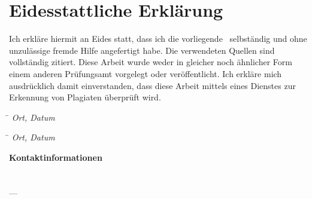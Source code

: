 
\chapter*{Eidesstattliche Erklärung}

Ich erkläre hiermit an Eides statt, dass ich die vorliegende \DocumentThesisType\ selbständig und ohne unzulässige fremde Hilfe angefertigt habe. Die verwendeten Quellen sind vollständig zitiert. Diese Arbeit wurde weder in gleicher noch ähnlicher Form einem anderen Prüfungsamt vorgelegt oder veröffentlicht. Ich erkläre mich ausdrücklich damit einverstanden, dass diese Arbeit mittels eines Dienstes zur Erkennung von Plagiaten überprüft wird.

\vspace{2cm}

\begin{tabbing}
  \hspace{6cm} \= \kill
  \textit{Ort, Datum} \> \textit{\DocumentAuthorPrename\ \DocumentAuthorName}
\end{tabbing}
\vspace{1cm}
\begin{tabbing}
	\hspace{6cm} \= \kill
	\textit{Ort, Datum} \> \textit{\DocumentSecondAuthorPrename\ \DocumentSecondAuthorName}
\end{tabbing}
\vspace{7,5cm}

\noindent
\textbf{Kontaktinformationen}\\
\DocumentAuthorPrename\ \DocumentAuthorName \\ \DocumentAuthorEmail
\\---\\
\noindent
\DocumentSecondAuthorPrename\ \DocumentSecondAuthorName \\\DocumentSecondAuthorEmail
\indent
